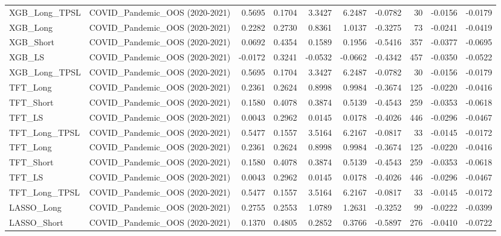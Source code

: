\begin{tabular}{llrrrrrrrr}
\cline{1-10}
XGB\_Long\_TPSL & COVID\_Pandemic\_OOS (2020-2021) & 0.5695 & 0.1704 & 3.3427 & 6.2487 & -0.0782 & 30 & -0.0156 & -0.0179 \\
\cline{1-10}
XGB\_Long & COVID\_Pandemic\_OOS (2020-2021) & 0.2282 & 0.2730 & 0.8361 & 1.0137 & -0.3275 & 73 & -0.0241 & -0.0419 \\
\cline{1-10}
XGB\_Short & COVID\_Pandemic\_OOS (2020-2021) & 0.0692 & 0.4354 & 0.1589 & 0.1956 & -0.5416 & 357 & -0.0377 & -0.0695 \\
\cline{1-10}
XGB\_LS & COVID\_Pandemic\_OOS (2020-2021) & -0.0172 & 0.3241 & -0.0532 & -0.0662 & -0.4342 & 457 & -0.0350 & -0.0522 \\
\cline{1-10}
XGB\_Long\_TPSL & COVID\_Pandemic\_OOS (2020-2021) & 0.5695 & 0.1704 & 3.3427 & 6.2487 & -0.0782 & 30 & -0.0156 & -0.0179 \\
\cline{1-10}
TFT\_Long & COVID\_Pandemic\_OOS (2020-2021) & 0.2361 & 0.2624 & 0.8998 & 0.9984 & -0.3674 & 125 & -0.0220 & -0.0416 \\
\cline{1-10}
TFT\_Short & COVID\_Pandemic\_OOS (2020-2021) & 0.1580 & 0.4078 & 0.3874 & 0.5139 & -0.4543 & 259 & -0.0353 & -0.0618 \\
\cline{1-10}
TFT\_LS & COVID\_Pandemic\_OOS (2020-2021) & 0.0043 & 0.2962 & 0.0145 & 0.0178 & -0.4026 & 446 & -0.0296 & -0.0467 \\
\cline{1-10}
TFT\_Long\_TPSL & COVID\_Pandemic\_OOS (2020-2021) & 0.5477 & 0.1557 & 3.5164 & 6.2167 & -0.0817 & 33 & -0.0145 & -0.0172 \\
\cline{1-10}
TFT\_Long & COVID\_Pandemic\_OOS (2020-2021) & 0.2361 & 0.2624 & 0.8998 & 0.9984 & -0.3674 & 125 & -0.0220 & -0.0416 \\
\cline{1-10}
TFT\_Short & COVID\_Pandemic\_OOS (2020-2021) & 0.1580 & 0.4078 & 0.3874 & 0.5139 & -0.4543 & 259 & -0.0353 & -0.0618 \\
\cline{1-10}
TFT\_LS & COVID\_Pandemic\_OOS (2020-2021) & 0.0043 & 0.2962 & 0.0145 & 0.0178 & -0.4026 & 446 & -0.0296 & -0.0467 \\
\cline{1-10}
TFT\_Long\_TPSL & COVID\_Pandemic\_OOS (2020-2021) & 0.5477 & 0.1557 & 3.5164 & 6.2167 & -0.0817 & 33 & -0.0145 & -0.0172 \\
\cline{1-10}
LASSO\_Long & COVID\_Pandemic\_OOS (2020-2021) & 0.2755 & 0.2553 & 1.0789 & 1.2631 & -0.3252 & 99 & -0.0222 & -0.0399 \\
\cline{1-10}
LASSO\_Short & COVID\_Pandemic\_OOS (2020-2021) & 0.1370 & 0.4805 & 0.2852 & 0.3766 & -0.5897 & 276 & -0.0410 & -0.0722 \\

\end{tabular}
